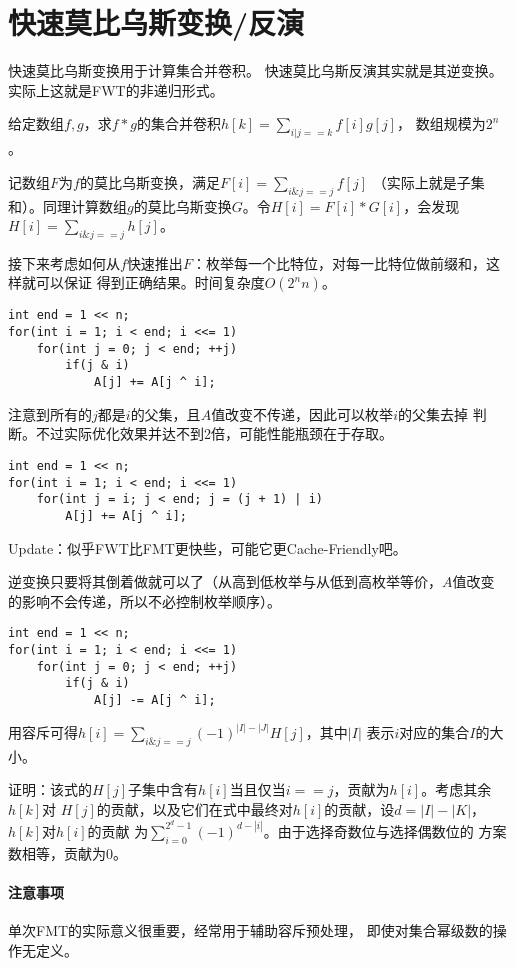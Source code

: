 \section{快速莫比乌斯变换/反演}\label{FMT}
快速莫比乌斯变换用于计算集合并卷积。
快速莫比乌斯反演其实就是其逆变换。
实际上这就是FWT的非递归形式。

给定数组$f,g$，求$f*g$的集合并卷积$\displaystyle h[k]=\sum_{i|j==k}{f[i]g[j]}$，
数组规模为$2^n$。

记数组$F$为$f$的莫比乌斯变换，满足$\displaystyle F[i]=\sum_{i\&j==j}{f[j]}$
（实际上就是子集和）。同理计算数组$g$的莫比乌斯变换$G$。令$H[i]=F[i]*G[i]$，会发现
$\displaystyle H[i]=\sum_{i\&j==j}{h[j]}$。

接下来考虑如何从$f$快速推出$F$：枚举每一个比特位，对每一比特位做前缀和，这样就可以保证
得到正确结果。时间复杂度$O(2^nn)$。
\begin{lstlisting}
int end = 1 << n;
for(int i = 1; i < end; i <<= 1)
    for(int j = 0; j < end; ++j)
        if(j & i)
            A[j] += A[j ^ i];
\end{lstlisting}

注意到所有的$j$都是$i$的父集，且$A$值改变不传递，因此可以枚举$i$的父集去掉
判断。不过实际优化效果并达不到2倍，可能性能瓶颈在于存取。

\begin{lstlisting}
int end = 1 << n;
for(int i = 1; i < end; i <<= 1)
    for(int j = i; j < end; j = (j + 1) | i)
        A[j] += A[j ^ i];
\end{lstlisting}

Update：似乎FWT比FMT更快些，可能它更Cache-Friendly吧。

逆变换只要将其倒着做就可以了（从高到低枚举与从低到高枚举等价，$A$值改变
的影响不会传递，所以不必控制枚举顺序）。
\begin{lstlisting}
int end = 1 << n;
for(int i = 1; i < end; i <<= 1)
    for(int j = 0; j < end; ++j)
        if(j & i)
            A[j] -= A[j ^ i];
\end{lstlisting}

用容斥可得$\displaystyle h[i]=\sum_{i\&j==j}{(-1)^{|I|-|J|}H[j]}$，其中$|I|$
表示$i$对应的集合$I$的大小。

证明：该式的$H[j]$子集中含有$h[i]$当且仅当$i==j$，贡献为$h[i]$。考虑其余$h[k]$对
$H[j]$的贡献，以及它们在式中最终对$h[i]$的贡献，设$d=|I|-|K|$，$h[k]$对$h[i]$的贡献
为$\displaystyle \sum_{i=0}^{2^d-1}{(-1)^{d-|i|}}$。由于选择奇数位与选择偶数位的
方案数相等，贡献为0。

\paragraph{注意事项} 单次FMT的实际意义很重要，经常用于辅助容斥预处理，
即使对集合幂级数的操作无定义。

